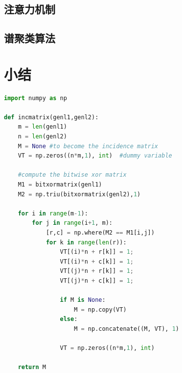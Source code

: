 \subsection{注意力机制}
\subsection{谱聚类算法}

\section{小结}

\begin{lstlisting}[language=Python, caption={Python Code}, label={lst:pythonfile}]
import numpy as np

def incmatrix(genl1,genl2):
    m = len(genl1)
    n = len(genl2)
    M = None #to become the incidence matrix
    VT = np.zeros((n*m,1), int)  #dummy variable

    #compute the bitwise xor matrix
    M1 = bitxormatrix(genl1)
    M2 = np.triu(bitxormatrix(genl2),1)

    for i in range(m-1):
        for j in range(i+1, m):
            [r,c] = np.where(M2 == M1[i,j])
            for k in range(len(r)):
                VT[(i)*n + r[k]] = 1;
                VT[(i)*n + c[k]] = 1;
                VT[(j)*n + r[k]] = 1;
                VT[(j)*n + c[k]] = 1;

                if M is None:
                    M = np.copy(VT)
                else:
                    M = np.concatenate((M, VT), 1)

                VT = np.zeros((n*m,1), int)

    return M
\end{lstlisting}
